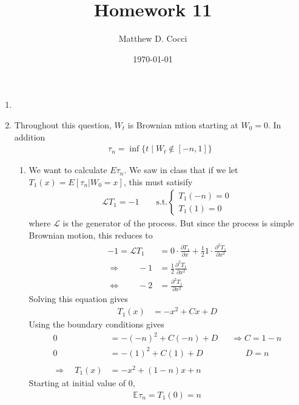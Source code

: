 \documentclass[12pt]{article}
\author{Matthew D. Cocci}
\title{Homework 11}
\date{\today}
\theoremstyle{plain}
\theoremstyle{definition}
\theoremstyle{remark}
\begin{document}
\maketitle



\begin{enumerate}
  \item %
  \item %
    Throughout this question, $W_t$ is Brownian mtion starting at
    $W_0=0$. In addition
    \begin{align*}
      \tau_n = \inf \{t \; | \; W_t \not\in [-n,1]\}
    \end{align*}
    \begin{enumerate}
      \item %
        We want to calculate $E\tau_n$. We saw in class that if we let
        $T_1(x) = E[\tau_n | W_0=x]$, this must satisify
        \begin{align*}
          \mathscr{L}T_1 = -1
          \qquad \text{s.t.}
          \begin{cases}
            T_1(-n) = 0 \\
            T_1(1)=0
          \end{cases}
        \end{align*}
        where $\mathscr{L}$ is the generator of the process. But since
        the process is simple Brownian motion, this reduces to
        \begin{align*}
          -1 = \mathscr{L}T_1
          &= 0 \cdot \frac{\partial T_1}{\partial x}
          + \frac{1}{2} 1\cdot \frac{\partial^2 T_1}{\partial x^2}\\
          \Rightarrow\qquad
          -1 &= \frac{1}{2} \frac{\partial^2 T_1}{\partial x^2}\\
          \Leftrightarrow\qquad
          -2 &= \frac{\partial^2 T_1}{\partial x^2}
        \end{align*}
        Solving this equation gives
        \begin{align*}
          T_1(x) &= -x^2 + Cx + D
        \end{align*}
        Using the boundary conditions gives
        \begin{align*}
          0 &= -(-n)^2 + C(-n) + D
          \;\;\quad \Rightarrow
          C = 1-n\\
          0 &= -(1)^2 + C(1) + D \quad\qquad\qquad
          D = n\\\\
          \Rightarrow \quad
          T_1(x) &= -x^2 + (1-n)x + n
        \end{align*}
        Starting at initial value of 0,
        \begin{align*}
          \mathbb{E}\tau_n = T_1(0) = n
        \end{align*}


\end{enumerate}
\end{enumerate}
\end{document}

